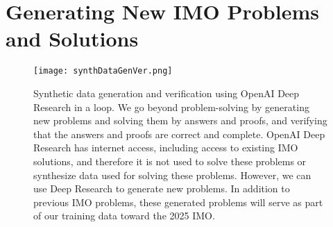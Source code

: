 \section{Generating New IMO Problems and Solutions}
\label{appendix:Y}


\begin{figure}[b!]
  \centering
  \texttt{[image: synthDataGenVer.png]}
  \caption{Synthetic data generation and verification using OpenAI Deep Research in a loop. We go beyond problem-solving by generating new problems and solving them by answers and  proofs, and verifying that the answers and proofs are correct and complete. OpenAI Deep Research has internet access, including access to existing IMO solutions, and therefore it is not used to solve these problems or synthesize data used for solving these problems. However, we can use Deep Research to generate new problems. In addition to previous IMO problems, these generated problems will serve as part of our training data toward the 2025 IMO.}
  \label{fig:synthDataGenVer}
\end{figure}
